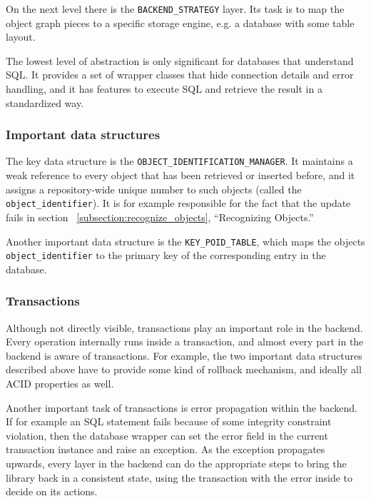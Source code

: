 On the next level there is the \lstinline!BACKEND_STRATEGY! layer.
Its task is to map the object graph pieces to a specific storage engine, e.g. a database with some table layout.

The lowest level of abstraction is only significant for databases that understand SQL. 
It provides a set of wrapper classes that hide connection details and error handling, and it has features to execute SQL and retrieve the result in a standardized way.

\subsubsection{Important data structures}

The key data structure is the \lstinline!OBJECT_IDENTIFICATION_MANAGER!.
It maintains a weak reference to every object that has been retrieved or inserted before, and it assigns a repository-wide unique number to such objects (called the \lstinline!object_identifier!).
It is for example responsible for the fact that the update fails in section ~\ref{subsection:recognize_objects}, ``Recognizing Objects.''

Another important data structure is the \lstinline!KEY_POID_TABLE!, which maps the objects \lstinline!object_identifier! to the primary key of the corresponding entry in the database.

\subsubsection{Transactions}

Although not directly visible, transactions play an important role in the backend.
Every operation internally runs inside a transaction, and almost every part in the backend is aware of transactions.
For example, the two important data structures described above have to provide some kind of rollback mechanism, and ideally all ACID %
properties as well.

Another important task of transactions is error propagation within the backend.
If for example an SQL statement fails because of some integrity constraint violation, then the database wrapper can set the error field in the current transaction instance and raise an exception.
As the exception propagates upwards, every layer in the backend can do the appropriate steps to bring the library back in a consistent state, using the transaction with the error inside to decide on its actions.

